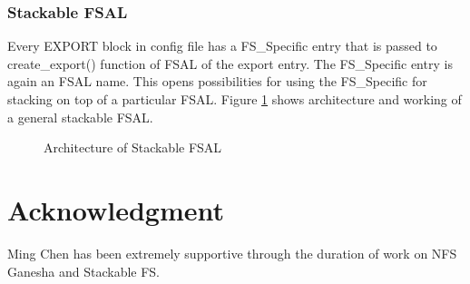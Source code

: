 \documentclass[11pt, journal, twocolumn, twoside]{IEEEtran}
\begin{document}
\subsubsection{Stackable FSAL}
Every EXPORT block in config file has a FS\_Specific entry that is passed to create\_export()
function of FSAL of the export entry. The FS\_Specific entry is again an FSAL name. This
opens possibilities for using the FS\_Specific for stacking on top of a particular FSAL.
Figure \ref{fsalStackArch} shows architecture and working of a  general stackable FSAL.

\begin{figure}[!btp]
  \centering
  \caption{Architecture of Stackable FSAL}
  \label{fsalStackArch}
\end{figure}

\section*{Acknowledgment}
Ming Chen has been extremely supportive through the duration of work on NFS Ganesha and Stackable FS.



\end{document}
